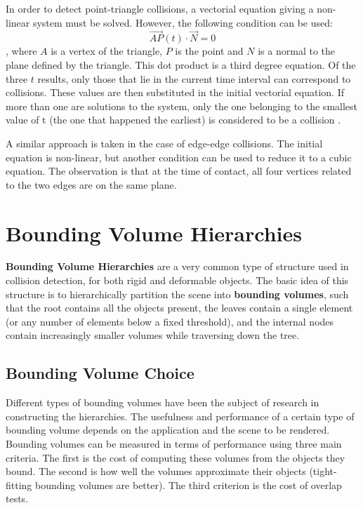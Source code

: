 In order to detect point-triangle collisions, a vectorial equation giving a non-linear system must be solved. However, the following condition can be used: \[\overrightarrow{AP}(t) \cdot \overrightarrow{N} = 0\], where $A$ is a vertex of the triangle, $P$ is the point and $N$ is a normal to the plane defined by the triangle. This dot product is a third degree equation. Of the three $t$ results, only those that lie in the current time interval can correspond to collisions. These values are then substituted in the initial vectorial equation. If more than one are solutions to the system, only the one belonging to the smallest value of t (the one that happened the earliest) is considered to be a collision \citep{provot97}.

A similar approach is taken in the case of edge-edge collisions. The initial equation is non-linear, but another condition can be used to reduce it to a cubic equation. The observation is that at the time of contact, all four vertices related to the two edges are on the same plane.


\FloatBarrier
\section{Bounding Volume Hierarchies}
\label{sec:bvh}


\textbf{Bounding Volume Hierarchies} are a very common type of structure used in collision detection, for both rigid and deformable objects. The basic idea of this structure is to hierarchically partition the scene into \textbf{bounding volumes}, such that the root contains all the objects present, the leaves contain a single element (or any number of elements below a fixed threshold), and the internal nodes contain increasingly smaller volumes while traversing down the tree.

\subsection{Bounding Volume Choice}
\label{sub-sec:bvc}

Different types of bounding volumes have been the subject of research in constructing the hierarchies. The usefulness and performance of a certain type of bounding volume depends on the application and the scene to be rendered. Bounding volumes can be measured in terms of performance using three main criteria. The first is the cost of computing these volumes from the objects they bound. The second is how well the volumes approximate their objects (tight-fitting bounding volumes are better). The third criterion is the cost of overlap tests.


